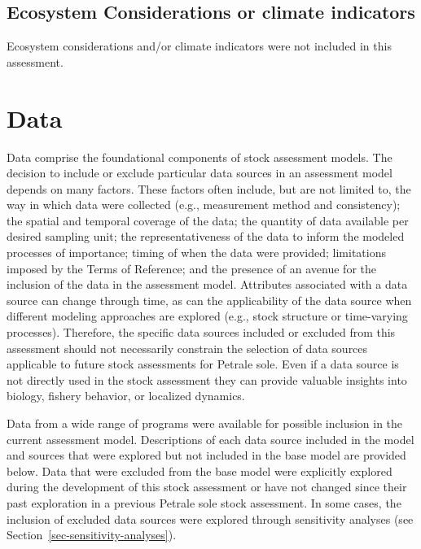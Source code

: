 \documentclass[
]{scrartcl}
\begin{document}
\subsection{Ecosystem Considerations or climate
indicators}\label{ecosystem-considerations-or-climate-indicators}

Ecosystem considerations and/or climate indicators were not included in
this assessment.

\newpage{}

\section{Data}\label{sec-data}

Data comprise the foundational components of stock assessment models.
The decision to include or exclude particular data sources in an
assessment model depends on many factors. These factors often include,
but are not limited to, the way in which data were collected (e.g.,
measurement method and consistency); the spatial and temporal coverage
of the data; the quantity of data available per desired sampling unit;
the representativeness of the data to inform the modeled processes of
importance; timing of when the data were provided; limitations imposed
by the Terms of Reference; and the presence of an avenue for the
inclusion of the data in the assessment model. Attributes associated
with a data source can change through time, as can the applicability of
the data source when different modeling approaches are explored (e.g.,
stock structure or time-varying processes). Therefore, the specific data
sources included or excluded from this assessment should not necessarily
constrain the selection of data sources applicable to future stock
assessments for Petrale sole. Even if a data source is not directly used
in the stock assessment they can provide valuable insights into biology,
fishery behavior, or localized dynamics.

Data from a wide range of programs were available for possible inclusion
in the current assessment model. Descriptions of each data source
included in the model and sources that were explored but not included in
the base model are provided below. Data that were excluded from the base
model were explicitly explored during the development of this stock
assessment or have not changed since their past exploration in a
previous Petrale sole stock assessment. In some cases, the inclusion of
excluded data sources were explored through sensitivity analyses (see
Section~\ref{sec-sensitivity-analyses}).
\end{document}
